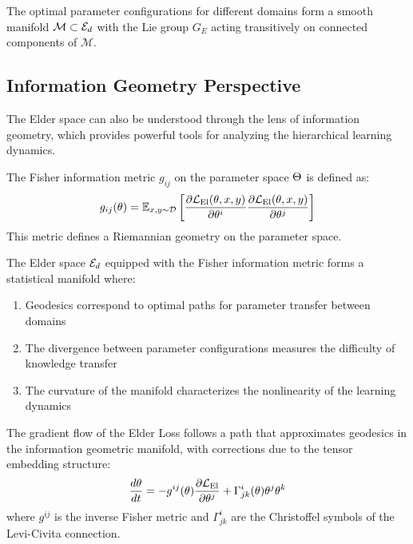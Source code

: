 \begin{corollary}
The optimal parameter configurations for different domains form a smooth manifold $\mathcal{M} \subset \mathcal{E}_{d}$ with the Lie group $G_E$ acting transitively on connected components of $\mathcal{M}$.
\end{corollary}

\subsection{Information Geometry Perspective}

The Elder space can also be understood through the lens of information geometry, which provides powerful tools for analyzing the hierarchical learning dynamics.

\begin{definition}
The Fisher information metric $g_{ij}$ on the parameter space $\Theta$ is defined as:
\begin{equation}
g_{ij}(\theta) = \mathbb{E}_{x,y \sim \mathcal{D}}\left[ \frac{\partial \mathcal{L}_{\text{El}}(\theta, x, y)}{\partial \theta^i} \frac{\partial \mathcal{L}_{\text{El}}(\theta, x, y)}{\partial \theta^j} \right]
\end{equation}
This metric defines a Riemannian geometry on the parameter space.
\end{definition}

\begin{theorem}
The Elder space $\mathcal{E}_{d}$ equipped with the Fisher information metric forms a statistical manifold where:
\begin{enumerate}
\item Geodesics correspond to optimal paths for parameter transfer between domains
\item The divergence between parameter configurations measures the difficulty of knowledge transfer
\item The curvature of the manifold characterizes the nonlinearity of the learning dynamics
\end{enumerate}
\end{theorem}

\begin{proposition}
The gradient flow of the Elder Loss follows a path that approximates geodesics in the information geometric manifold, with corrections due to the tensor embedding structure:
\begin{equation}
\frac{d\theta}{dt} = -g^{ij}(\theta) \frac{\partial \mathcal{L}_{\text{El}}}{\partial \theta^j} + \Gamma^i_{jk}(\theta) \theta^j \theta^k
\end{equation}
where $g^{ij}$ is the inverse Fisher metric and $\Gamma^i_{jk}$ are the Christoffel symbols of the Levi-Civita connection.
\end{proposition}

